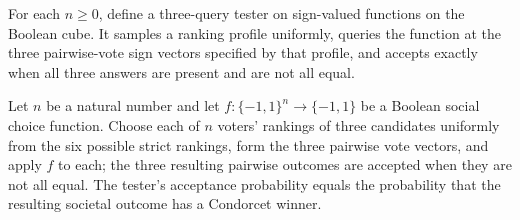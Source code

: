 \begin{definition}
\label{FABL.naeFunctionTester}
\leanok
{}
For each $n\ge 0$, define a three-query tester on sign-valued functions on the Boolean
cube. It samples a ranking profile uniformly, queries the function at the three
pairwise-vote sign vectors specified by that profile, and accepts exactly when all three
answers are present and are not all equal.
\end{definition}

\begin{theorem}
\label{FABL.naeFunctionTester_acceptanceProbability}
\leanok
{}
Let $n$ be a natural number and let $f:\{-1,1\}^n\to\{-1,1\}$ be a Boolean social choice
function. Choose each of $n$ voters' rankings of three candidates uniformly from the six
possible strict rankings, form the three pairwise vote vectors, and apply $f$ to each;
the three resulting pairwise outcomes are accepted when they are not all equal. The
tester's acceptance probability equals the probability that the resulting societal
outcome has a Condorcet winner.
\end{theorem}

